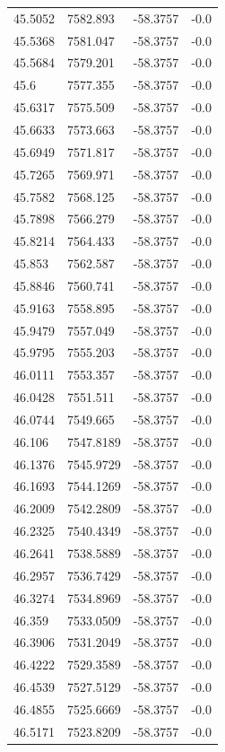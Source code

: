 \begin{table}[H]
\begin{tabular}{llll}
45.5052 & 7582.893 & -58.3757 & -0.0 \\
45.5368 & 7581.047 & -58.3757 & -0.0 \\
45.5684 & 7579.201 & -58.3757 & -0.0 \\
45.6 & 7577.355 & -58.3757 & -0.0 \\
45.6317 & 7575.509 & -58.3757 & -0.0 \\
45.6633 & 7573.663 & -58.3757 & -0.0 \\
45.6949 & 7571.817 & -58.3757 & -0.0 \\
45.7265 & 7569.971 & -58.3757 & -0.0 \\
45.7582 & 7568.125 & -58.3757 & -0.0 \\
45.7898 & 7566.279 & -58.3757 & -0.0 \\
45.8214 & 7564.433 & -58.3757 & -0.0 \\
45.853 & 7562.587 & -58.3757 & -0.0 \\
45.8846 & 7560.741 & -58.3757 & -0.0 \\
45.9163 & 7558.895 & -58.3757 & -0.0 \\
45.9479 & 7557.049 & -58.3757 & -0.0 \\
45.9795 & 7555.203 & -58.3757 & -0.0 \\
46.0111 & 7553.357 & -58.3757 & -0.0 \\
46.0428 & 7551.511 & -58.3757 & -0.0 \\
46.0744 & 7549.665 & -58.3757 & -0.0 \\
46.106 & 7547.8189 & -58.3757 & -0.0 \\
46.1376 & 7545.9729 & -58.3757 & -0.0 \\
46.1693 & 7544.1269 & -58.3757 & -0.0 \\
46.2009 & 7542.2809 & -58.3757 & -0.0 \\
46.2325 & 7540.4349 & -58.3757 & -0.0 \\
46.2641 & 7538.5889 & -58.3757 & -0.0 \\
46.2957 & 7536.7429 & -58.3757 & -0.0 \\
46.3274 & 7534.8969 & -58.3757 & -0.0 \\
46.359 & 7533.0509 & -58.3757 & -0.0 \\
46.3906 & 7531.2049 & -58.3757 & -0.0 \\
46.4222 & 7529.3589 & -58.3757 & -0.0 \\
46.4539 & 7527.5129 & -58.3757 & -0.0 \\
46.4855 & 7525.6669 & -58.3757 & -0.0 \\
46.5171 & 7523.8209 & -58.3757 & -0.0 \\

\end{tabular}
\end{table}
